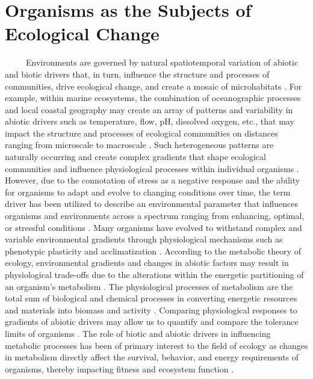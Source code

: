 \documentclass[
  12pt,
]{article}
\begin{document}
\hypertarget{organisms-as-the-subjects-of-ecological-change}{%
\section{Organisms as the Subjects of Ecological
Change}\label{organisms-as-the-subjects-of-ecological-change}}

~~~~~Environments are governed by natural spatiotemporal variation of
abiotic and biotic drivers that, in turn, influence the structure and
processes of communities, drive ecological change, and create a mosaic
of microhabitats
\cite{connell1961influence, stenseth2002ecological, kroeker2017embracing}.
For example, within marine ecosystems, the combination of oceanographic
processes and local coastal geography may create an array of patterns
and variability in abiotic drivers such as temperature, flow, pH,
dissolved oxygen, etc., that may impact the structure and processes of
ecological communities on distances ranging from microscale to
macroscale \cite{deser2010sea, hofmann2010living}. Such heterogeneous
patterns are naturally occurring and create complex gradients that shape
ecological communities and influence physiological processes within
individual organisms \cite{helmuth2006mosaic}. However, due to the
connotation of stress as a negative response and the ability for
organisms to adapt and evolve to changing conditions over time, the term
driver has been utilized to describe an environmental parameter that
influences organisms and environments across a spectrum ranging from
enhancing, optimal, or stressful conditions
\cite{cote2016interactions, boyd2012understanding}. Many organisms have
evolved to withstand complex and variable environmental gradients
through physiological mechanisms such as phenotypic plasticity and
acclimatization \cite{hofmann2010living, tomanek2002heat}. According to
the metabolic theory of ecology, environmental gradients and changes in
abiotic factors may result in physiological trade-offs due to the
alterations within the energetic partitioning of an organism's
metabolism \cite{portner2008physiology, brown2004toward}. The
physiological processes of metabolism are the total sum of biological
and chemical processes in converting energetic resources and materials
into biomass and activity \cite{brown2004toward}. Comparing
physiological responses to gradients of abiotic drivers may allow us to
quantify and compare the tolerance limits of organisms
\cite{somero2002thermal, silbiger2019comparative}. The role of biotic
and abiotic drivers in influencing metabolic processes has been of
primary interest to the field of ecology as changes in metabolism
directly affect the survival, behavior, and energy requirements of
organisms, thereby impacting fitness and ecosystem function
\cite{carey2016sea}.
\end{document}
